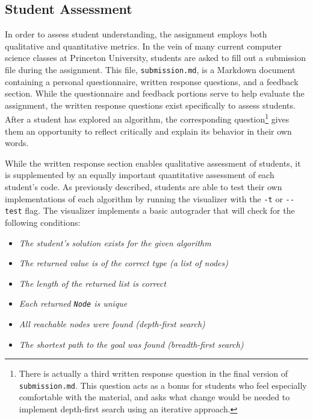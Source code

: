 \documentclass[pageno]{jpaper}
\begin{document}
\subsection{Student Assessment}

In order to assess student understanding, the assignment employs both qualitative and quantitative metrics. In the vein of many current computer science classes at Princeton University, students are asked to fill out a submission file during the assignment. This file, \texttt{submission.md}, is a Markdown document containing a personal questionnaire, written response questions, and a feedback section. While the questionnaire and feedback portions serve to help evaluate the assignment, the written response questions exist specifically to assess students. After a student has explored an algorithm, the corresponding question\footnote{There is actually a third written response question in the final version of \texttt{submission.md}. This question acts as a bonus for students who feel especially comfortable with the material, and asks what change would be needed to implement depth-first search using an iterative approach.} gives them an opportunity to reflect critically and explain its behavior in their own words.

While the written response section enables qualitative assessment of students, it is supplemented by an equally important quantitative assessment of each student's code. As previously described, students are able to test their own implementations of each algorithm by running the visualizer with the \texttt{-t} or \texttt{-{}-test} flag. The visualizer implements a basic autograder that will check for the following conditions:

\begin{itemize}[leftmargin=3cm,font=\textnormal]
\item \emph{The student's solution exists for the given algorithm}
\item \emph{The returned value is of the correct type (a list of nodes)}
\item \emph{The length of the returned list is correct}
\item \emph{Each returned \texttt{Node} is unique}
\item \emph{All reachable nodes were found (depth-first search)}
\item \emph{The shortest path to the goal was found (breadth-first search)}
\end{itemize}
\end{document}
